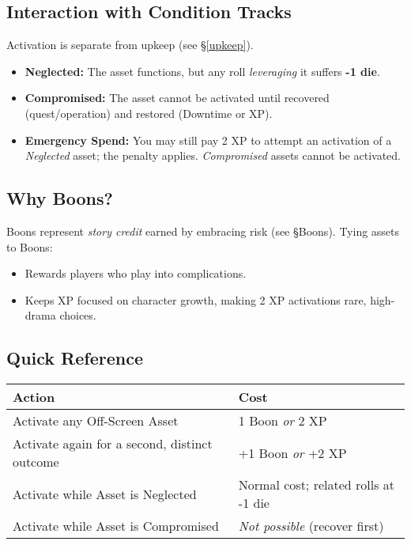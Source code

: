 \documentclass[12pt]{book}
\begin{document}
\subsection*{Interaction with Condition Tracks}
Activation is separate from upkeep (see \S\ref{upkeep}).
\begin{itemize}
  \item \textbf{Neglected:} The asset functions, but any roll \emph{leveraging} it suffers \textbf{-1 die}.
  \item \textbf{Compromised:} The asset cannot be activated until recovered (quest/operation) and restored (Downtime or XP).
  \item \textbf{Emergency Spend:} You may still pay 2 XP to attempt an activation of a \emph{Neglected} asset; the penalty applies. \emph{Compromised} assets cannot be activated.
\end{itemize}

\subsection*{Why Boons?}
Boons represent \emph{story credit} earned by embracing risk (see \S Boons). Tying assets to Boons:
\begin{itemize}
  \item Rewards players who play into complications.
  \item Keeps XP focused on character growth, making 2 XP activations rare, high-drama choices.
\end{itemize}

\subsection*{Quick Reference}
\begin{center}
\begin{tabular}{ll}
\toprule
\textbf{Action} & \textbf{Cost} \\
\midrule
Activate any Off-Screen Asset & 1 Boon \emph{or} 2 XP \\
Activate again for a second, distinct outcome & +1 Boon \emph{or} +2 XP \\
Activate while Asset is Neglected & Normal cost; related rolls at -1 die \\
Activate while Asset is Compromised & \textit{Not possible} (recover first) \\
\bottomrule
\end{tabular}
\end{center}
\end{document}

